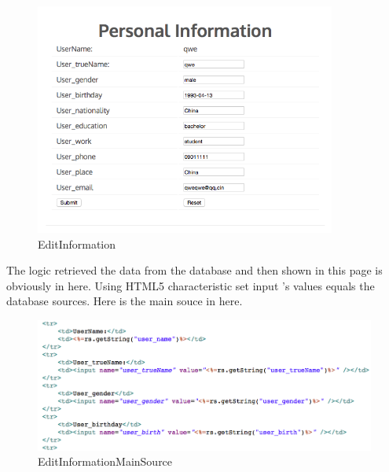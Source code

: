 \documentclass[12pt]{article}
\begin{document}
\begin{figure}[H]
	\centering	
	\includegraphics[height=3in]{images/EditInformation.jpg}
	\caption[EditInformation]{EditInformation}
	\label{fig:EditInformation}
\end{figure}

The logic retrieved the data from the database and then shown in this page is obviously in here. Using HTML5 characteristic set input 's values equals the database sources. Here is the main souce in here.
\begin{figure}[H]
	\centering	
\includegraphics[width=15cm]{images/EditInformationMainSource.jpg}

	\caption[EditInformationMainSource]{EditInformationMainSource}
	\label{fig:EditInformationMainSource}
\end{figure}
\cleardoublepage
\end{document}
